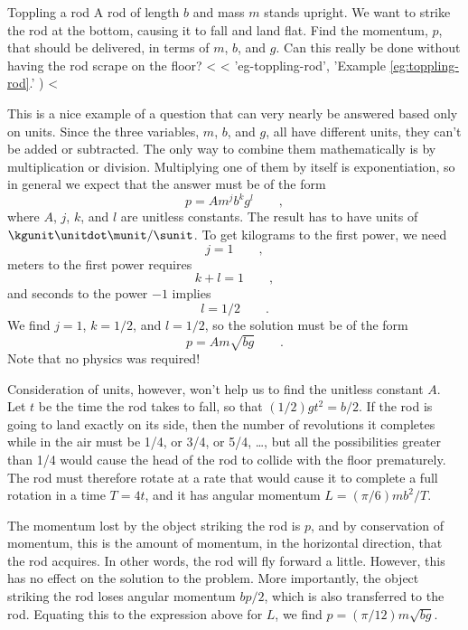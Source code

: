 \begin{eg}{Toppling a rod}\label{eg:toppling-rod}
\egquestion A rod of length $b$ and mass $m$ stands upright. We want
to strike the rod at the bottom, causing it to fall and land flat.
Find the momentum, $p$, that should be delivered, in terms of $m$, $b$,
and $g$. Can this really be done without having the rod scrape on the floor?
<%
<%
    'eg-toppling-rod',
    'Example \ref{eg:toppling-rod}.'
  )
<%

\eganswer This is a nice example of a question that can very nearly be
answered based only on units. Since the three variables, $m$, $b$,
and $g$, all have different units, they can't be added or subtracted.
The only way to combine them mathematically is by multiplication or division.
Multiplying one of them by itself is exponentiation, so in general
we expect that the answer must be of the form
\begin{equation*}
  p = A m^j b^k g^l \qquad ,
\end{equation*}
where $A$, $j$, $k$, and $l$ are unitless constants. The result has
to have units of $\kgunit\unitdot\munit/\sunit$. To get kilograms to
the first power, we need
\begin{equation*}
  j=1 \qquad ,
\end{equation*}
meters to the first power requires
\begin{equation*}
  k+l=1 \qquad ,
\end{equation*}
and
seconds to the power $-1$ implies
\begin{equation*}
  l=1/2 \qquad .
\end{equation*}
We find $j=1$, $k=1/2$, and $l=1/2$, so the solution must be of the form
\begin{equation*}
  p = A m\sqrt{bg} \qquad .
\end{equation*}
Note that no physics was required!

Consideration of units, however, won't help us to find the unitless constant
$A$. Let $t$ be the time the rod takes to fall, so that $(1/2)gt^2=b/2$.
If the rod is going to land exactly on its side, then the number of revolutions
it completes while in the air must be 1/4, or 3/4, or 5/4,  \ldots, but all the
possibilities greater than 1/4 would cause the head of the rod to collide with
the floor prematurely. The rod must therefore rotate at a rate that would
cause it to complete a full rotation in a time $T=4t$, and it has angular
momentum $L=(\pi/6)mb^2/T$.

The momentum lost by the object striking
the rod is $p$, and by conservation of momentum, this is the amount of
momentum, in the horizontal direction, that the rod acquires. In other words,
the rod will fly forward a little. However, this has no effect on the solution
to the problem. More importantly, the object striking the rod loses angular
momentum $bp/2$, which is also transferred to the rod. Equating this to the
expression above for $L$, we find $p=(\pi/12)m\sqrt{bg}$.


\end{eg}
